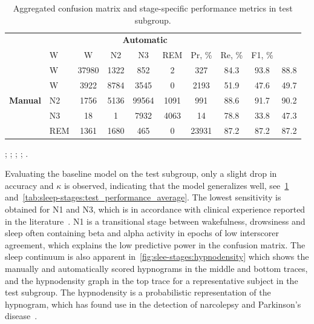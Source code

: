 \begin{table}[tb]
    \small
    \setlength{\tabcolsep}{4pt}
    \caption[\acs{MASSC} test group confusion matrix, \acs{WSC}]{Aggregated confusion matrix and stage-specific performance metrics in test subgroup.}
    \label{tab:sleep-stages:test_performance_aggregated}
    \centering
    \begin{threeparttable}
    \begin{tabular}{@{}llcccccccc@{}}
        \toprule
         & & \multicolumn{5}{c}{\textbf{Automatic}} & & & \\ \cline{2-7}
                 & \acs{W}     & \acs{W}   & \acs{N2}    & \acs{N3}   & \acs{REM}   & Pr, \% & Re, \% & F1, \% \\ \midrule
        \multirow{5}{*}{\textbf{Manual}} & \acs{W}        & 37980 & 1322 & 852   & 2    & 327   & 84.3    & 93.8    & 88.8    \\
         & \acs{W}       & 3922  & 8784 & 3545  & 0    & 2193  & 51.9    & 47.6    & 49.7    \\
         & \acs{N2}       & 1756  & 5136 & 99564 & 1091 & 991   & 88.6    & 91.7    & 90.2    \\
         & \acs{N3}       & 18    & 1    & 7932  & 4063 & 14    & 78.8    & 33.8    & 47.3    \\
         & \acs{REM}        & 1361  & 1680 & 465   & 0    & 23931 & 87.2    & 87.2    & 87.2    \\ \bottomrule
    \end{tabular}
    \begin{tablenotes}
        \small
        \item%
        ; %
        ; %
        ; %
        ; %
        .
    \end{tablenotes}
    \end{threeparttable}
\end{table}


Evaluating the baseline model on the test subgroup, only a slight drop in accuracy and $\kappa$ is observed, indicating that the model generalizes well, see~\cref{tab:sleep-stages:test_performance_aggregated} and~\cref{tab:sleep-stages:test_performance_average}.
The lowest sensitivity is obtained for \ac{N1} and \ac{N3}, which is in accordance with clinical experience reported in the literature~\cite{Younes2017, Rosenberg2013, Norman2000, Younes2016}.
N1 is a transitional stage between wakefulness, drowsiness and sleep often containing beta and alpha activity in epochs of low interscorer agreement, which explains the low predictive power in the confusion matrix.
The sleep continuum is also apparent in~\cref{fig:slee-stages:hypnodensity} which shows the manually and automatically scored hypnograms in the middle and bottom traces, and the hypnodensity graph in the top trace for a representative subject in the test subgroup.
The hypnodensity is a probabilistic representation of the hypnogram, which has found use in the detection of narcolepsy and Parkinson's disease~\cite{Koch2014, Christensen2014, Stephansen2018}.

